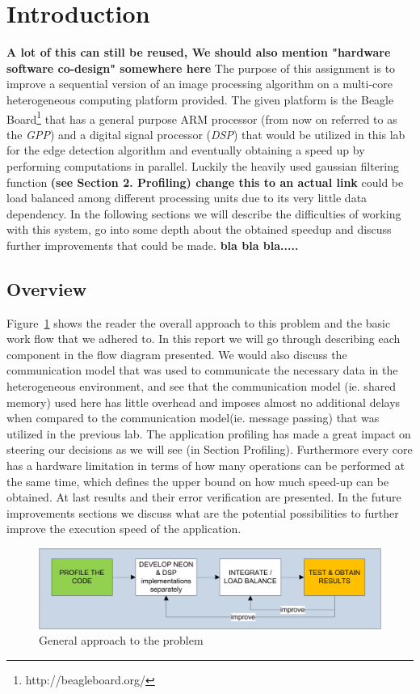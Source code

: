 \section{Introduction}
\textbf{A lot of this can still be reused,  We should also mention "hardware software co-design" somewhere here}
The purpose of this assignment is to improve a sequential version of an image processing algorithm on a multi-core heterogeneous computing platform provided. The given platform is the Beagle Board\footnote{http://beagleboard.org/} that has a general purpose ARM processor (from now on referred to as the \emph{GPP}) and a digital signal processor (\emph{DSP}) that would be utilized in this lab for the edge detection algorithm and eventually obtaining a speed up by performing computations in parallel. Luckily the heavily used gaussian filtering function \textbf{(see Section 2. Profiling) change this to an actual link} could be load balanced among different processing units due to its very little data dependency. In the following sections we will describe the difficulties of working with this system, go into some depth about the obtained speedup and discuss further improvements that could be made.
\textbf{bla bla bla..... }

\subsection{Overview}
Figure~\ref{fig:workflow} shows the reader the overall approach to this problem and the basic work flow that we adhered to. In this report we will go through describing each component in the flow diagram presented. We would also discuss the communication model that was used to communicate the necessary data in the heterogeneous environment, and see that the communication model (ie. shared memory) used here has little overhead and imposes almost no additional delays when compared to the communication model(ie. message passing) that was utilized in the previous lab. The application profiling has made a great impact on steering our decisions as we will see (in Section Profiling). Furthermore every core has a hardware limitation in terms of how many operations can be performed at the same time, which defines the upper bound on how much speed-up can be obtained. At last results and their error verification are presented. In the future improvements sections we discuss what are the potential possibilities to further improve the execution speed of the application.

\begin{figure}
\includegraphics[width=\linewidth]{drawings/workflow}
\caption{General approach to the problem}
\label{fig:workflow}
\end{figure}


